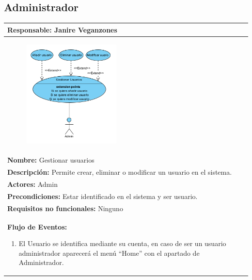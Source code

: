 \documentclass{report}
\begin{document}
            \subsection{Administrador}
                \begin{center}
                    \begin{longtable}{|p{\linewidth}|}
                        \hline
                        \textbf{Responsable:} Janire Veganzones\\
                        \hline
                        \begin{figure}[H]
                            \centering
                            \includegraphics[width=0.45\textwidth]{./img/casos_uso/CasoDeUsoGestionUsu.png}
                        \end{figure}\\
                        \hline
                        \textbf{Nombre:} Gestionar usuarios\\
                        \hline
                        \textbf{Descripción:}  Permite crear, eliminar o modificar un usuario en el sistema.\\
                        \hline
                        \textbf{Actores:} Admin\\
                        \hline
                        \textbf{Precondiciones:} Estar identificado en el sistema y ser usuario.\\
                        \hline
                        \textbf{Requisitos no funcionales:} Ninguno\\
                        \hline
                        \textbf{Flujo de Eventos:}
                        \begin{enumerate}
                            \item El Usuario se identifica mediante su cuenta, en caso de ser un usuario administrador aparecerá el menú “Home” con el apartado de Administrador.

\end{enumerate}
\end{longtable}
\end{center}
\end{document}
